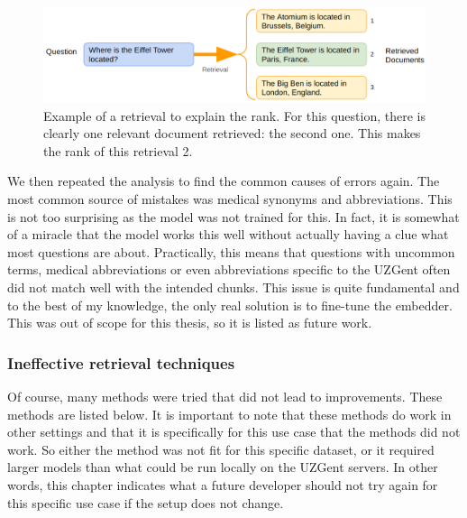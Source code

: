 \begin{figure}[h]
	\centering
	\captionsetup{justification=centering}
	\includegraphics[width=0.9\linewidth]{fig/RAG_rank.png}
	\caption{Example of a retrieval to explain the rank. For this question, there is clearly one relevant document retrieved: the second one. This makes the rank of this retrieval 2.}
	\label{fig:rag_rank}
\end{figure}

We then repeated the analysis to find the common causes of errors again. The most common source of mistakes was medical synonyms and abbreviations. This is not too surprising as the model was not trained for this. In fact, it is somewhat of a miracle that the model works this well without actually having a clue what most questions are about. Practically, this means that questions with uncommon terms, medical abbreviations or even abbreviations specific to the UZGent often did not match well with the intended chunks. This issue is quite fundamental and to the best of my knowledge, the only real solution is to fine-tune the embedder. This was out of scope for this thesis, so it is listed as future work.

\subsubsection{Ineffective retrieval techniques}
Of course, many methods were tried that did not lead to improvements. These methods are listed below. It is important to note that these methods do work in other settings and that it is specifically for this use case that the methods did not work. So either the method was not fit for this specific dataset, or it required larger models than what could be run locally on the UZGent servers. In other words, this chapter indicates what a future developer should not try again for this specific use case if the setup does not change.


